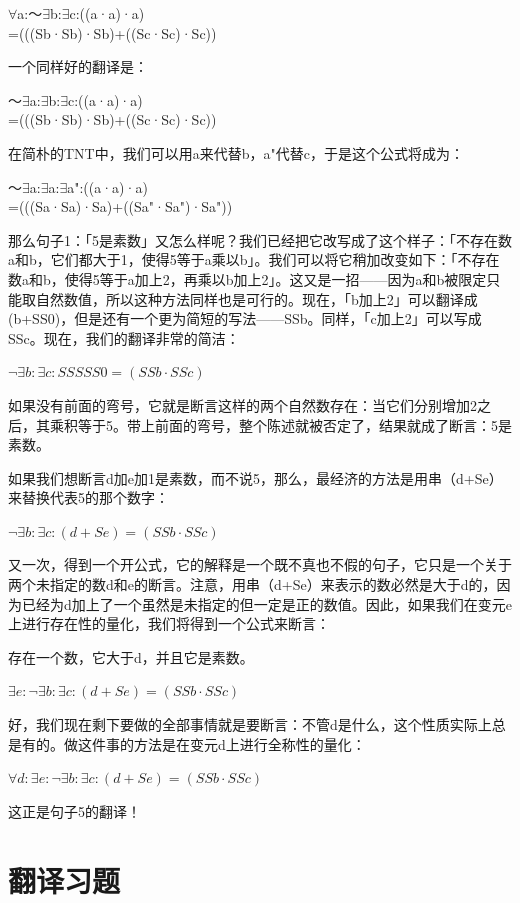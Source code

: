 \documentclass[
  12pt,
  twoside,
  openright,
  oldfontcommands,
]{memoir}
\begin{document}
$\forall$a:～$\exists$b:$\exists$c:((a·a)·a)\\
=(((Sb·Sb)·Sb)+((Sc·Sc)·Sc))

一个同样好的翻译是：

～$\exists$a:$\exists$b:$\exists$c:((a·a)·a)\\
=(((Sb·Sb)·Sb)+((Sc·Sc)·Sc))

在简朴的TNT中，我们可以用a\textquotesingle 来代替b，a"代替c，于是这个公式将成为：

～$\exists$a:$\exists$a\textquotesingle:$\exists$a":((a·a)·a)\\
=(((Sa\textquotesingle·Sa\textquotesingle)·Sa\textquotesingle)+((Sa"·Sa")·Sa"))

那么句子1：「5是素数」又怎么样呢？我们已经把它改写成了这个样子：「不存在数a和b，它们都大于1，使得5等于a乘以b」。我们可以将它稍加改变如下：「不存在数a和b，使得5等于a加上2，再乘以b加上2」。这又是一招------因为a和b被限定只能取自然数值，所以这种方法同样也是可行的。现在，「b加上2」可以翻译成(b+SS0)，但是还有一个更为简短的写法------SSb。同样，「c加上2」可以写成SSc。现在，我们的翻译非常的简洁：

$\lnot \exists b:\exists c:SSSSS0=(SSb\cdot SSc)$

如果没有前面的弯号，它就是断言这样的两个自然数存在：当它们分别增加2之后，其乘积等于5。带上前面的弯号，整个陈述就被否定了，结果就成了断言：5是素数。

如果我们想断言d加e加1是素数，而不说5，那么，最经济的方法是用串（d+Se）来替换代表5的那个数字：

$\lnot \exists b:\exists c:(d+Se)=(SSb\cdot SSc)$

又一次，得到一个开公式，它的解释是一个既不真也不假的句子，它只是一个关于两个未指定的数d和e的断言。注意，用串（d+Se）来表示的数必然是大于d的，因为已经为d加上了一个虽然是未指定的但一定是正的数值。因此，如果我们在变元e上进行存在性的量化，我们将得到一个公式来断言：

存在一个数，它大于d，并且它是素数。

$\exists e:\lnot \exists b:\exists c:(d+Se)=(SSb\cdot SSc)$

好，我们现在剩下要做的全部事情就是要断言：不管d是什么，这个性质实际上总是有的。做这件事的方法是在变元d上进行全称性的量化：

$\forall d:\exists e:\lnot \exists b:\exists c:(d+Se)=(SSb\cdot SSc)$

这正是句子5的翻译！

\section{翻译习题}
\end{document}
